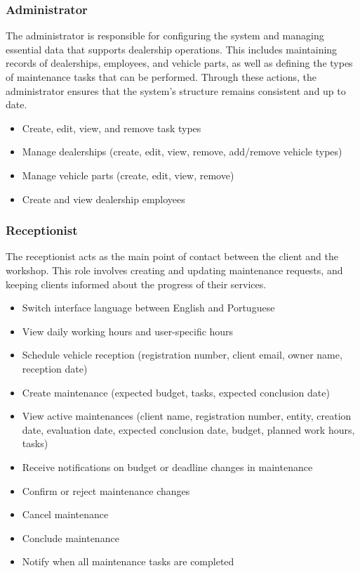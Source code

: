 \subsubsection{Administrator}

The administrator is responsible for configuring the system and managing essential data that supports dealership operations. This includes maintaining records of dealerships, employees, and vehicle parts, as well as defining the types of maintenance tasks that can be performed. Through these actions, the administrator ensures that the system's structure remains consistent and up to date.


\begin{itemize}
    \item Create, edit, view, and remove task types
    \item Manage dealerships (create, edit, view, remove, add/remove vehicle types)
    \item Manage vehicle parts (create, edit, view, remove)
    \item Create and view dealership employees
\end{itemize}

\subsubsection{Receptionist}

The receptionist acts as the main point of contact between the client and the workshop. This role involves creating and updating maintenance requests, and keeping clients informed about the progress of their services. 

\begin{itemize}
    \item Switch interface language between English and Portuguese
    \item View daily working hours and user-specific hours
    \item Schedule vehicle reception (registration number, client email, owner name, reception date)
    \item Create maintenance (expected budget, tasks, expected conclusion date)
    \item View active maintenances (client name, registration number, entity, creation date, evaluation date, expected conclusion date, budget, planned work hours, tasks)
    \item Receive notifications on budget or deadline changes in maintenance
    \item Confirm or reject maintenance changes
    \item Cancel maintenance
    \item Conclude maintenance
    \item Notify when all maintenance tasks are completed
\end{itemize}

